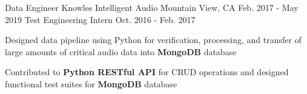 \begin{cventries}
\cventryupdate
    {Data Engineer} %
    {Knowles Intelligent Audio} %
    {Mountain View, CA} %
    {Feb. 2017 - May 2019} %
    {Test Engineering Intern} %
    {Oct. 2016 - Feb. 2017} %
    {
      \begin{cvitems} %
	\item {Designed data pipeline using Python for verification, processing, and transfer of large amounts of critical audio data into \textbf{MongoDB} database}
        \item {Contributed to \textbf{Python RESTful API} for CRUD operations and designed functional test suites for \textbf{MongoDB} database}
      \end{cvitems}
    }

\end{cventries}
